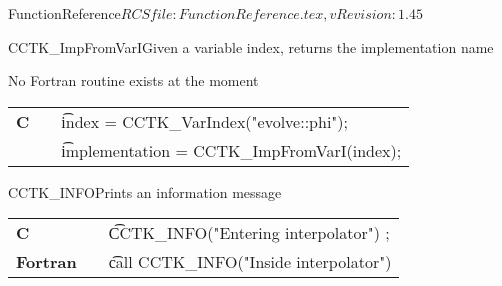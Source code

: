 \begin{cactuspart}{5}{FunctionReference}{$RCSfile: FunctionReference.tex,v $}{$Revision: 1.45 $}






\begin{CCTKFunc}{CCTK\_ImpFromVarI}{Given a variable index, returns the implementation name}
\label{CCTK-ImpFromVarI}
\showcargs
\begin{params}
\end{params}
\begin{discussion}
No Fortran routine exists at the moment
\end{discussion}
\begin{examples}
\begin{tabular}{@{}p{3cm}cp{11cm}}
\hfill {\bf C} && {\t index = CCTK\_VarIndex("evolve::phi");}\\
               &&{\t implementation = CCTK\_ImpFromVarI(index);}
\\
\end{tabular}
\end{examples}
\begin{errorcodes}
\end{errorcodes}
\end{CCTKFunc}





\begin{CCTKFunc}{CCTK\_INFO}{Prints an information message}
\label{CCTK-INFO}
\subroutine{}{}{}
\showargs
\begin{params}
\end{params}
\begin{discussion}
\end{discussion}
\begin{examples}
\begin{tabular}{@{}p{3cm}cp{11cm}}
\hfill {\bf C} && {\t CCTK\_INFO("Entering interpolator") };
\\
\hfill {\bf Fortran} && {\t call CCTK\_INFO("Inside interpolator")}
\\
\end{tabular}
\end{examples}
\begin{errorcodes}
\end{errorcodes}
\end{CCTKFunc}


\end{cactuspart}
